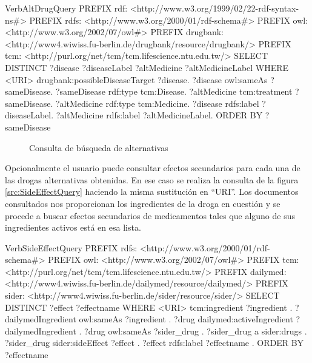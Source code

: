 \documentclass{article}
\begin{document}
\begin{SaveVerbatim}{VerbAltDrugQuery}
PREFIX rdf:  <http://www.w3.org/1999/02/22-rdf-syntax-ns#>
PREFIX rdfs: <http://www.w3.org/2000/01/rdf-schema#>
PREFIX owl:  <http://www.w3.org/2002/07/owl#>
PREFIX drugbank: <http://www4.wiwiss.fu-berlin.de/drugbank/resource/drugbank/>
PREFIX tcm:      <http://purl.org/net/tcm/tcm.lifescience.ntu.edu.tw/>
SELECT DISTINCT ?disease ?diseaseLabel ?altMedicine ?altMedicineLabel WHERE {
  <URI> drugbank:possibleDiseaseTarget ?disease.
  ?disease owl:sameAs ?sameDisease.
  ?sameDisease rdf:type tcm:Disease.
  ?altMedicine tcm:treatment ?sameDisease.
  ?altMedicine rdf:type tcm:Medicine.
  ?disease rdfs:label ?diseaseLabel.
  ?altMedicine rdfs:label ?altMedicineLabel.
}
ORDER BY ?sameDisease
\end{SaveVerbatim}

\begin{figure}[htbp]
 \fbox
 {
  \begin{minipage}{\textwidth}
   \caption{Consulta de búsqueda de alternativas}
   \label{src:AltDrugQuery}
  \end{minipage}
 }
\end{figure}

Opcionalmente el usuario puede consultar efectos secundarios para cada una de
las drogas alternativas obtenidas. En ese caso se realiza la consulta de la
figura \ref{src:SideEffectQuery} haciendo la misma sustitución en ``URI''. Los
documentos consultados nos proporcionan los ingredientes de la droga en
cuestión y se procede a buscar efectos secundarios de medicamentos tales que
alguno de sus ingredientes activos está en esa lista.

\begin{SaveVerbatim}{VerbSideEffectQuery}
PREFIX rdfs: <http://www.w3.org/2000/01/rdf-schema#>
PREFIX owl:  <http://www.w3.org/2002/07/owl#>
PREFIX tcm:      <http://purl.org/net/tcm/tcm.lifescience.ntu.edu.tw/>
PREFIX dailymed: <http://www4.wiwiss.fu-berlin.de/dailymed/resource/dailymed/>
PREFIX sider:    <http://www4.wiwiss.fu-berlin.de/sider/resource/sider/>
SELECT DISTINCT ?effect ?effectname WHERE {
        <URI> tcm:ingredient ?ingredient .
        ?dailymedIngredient owl:sameAs ?ingredient .
        ?drug dailymed:activeIngredient ?dailymedIngredient .
        ?drug owl:sameAs ?sider_drug .
        ?sider_drug a sider:drugs .
        ?sider_drug sider:sideEffect ?effect .
        ?effect rdfs:label ?effectname .
}
ORDER BY ?effectname
\end{SaveVerbatim}
\end{document}
